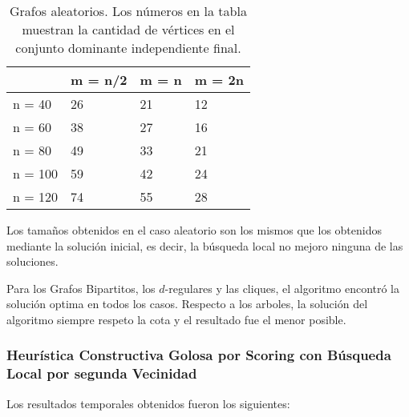 \begin{table}[H]
\centering
\label{my-label}
\begin{tabular}{|l|lll|}
\hline
        & \multicolumn{1}{l|}{m = n/2} & \multicolumn{1}{l|}{m = n} & m = 2n \\ \hline
n = 40  & 26                           & 21                         & 12     \\ \cline{1-1}
n = 60  & 38                           & 27                         & 16     \\ \cline{1-1}
n = 80  & 49                           & 33                         & 21     \\ \cline{1-1}
n = 100 & 59                           & 42                         & 24     \\ \cline{1-1}
n = 120 & 74                           & 55                         & 28     \\ \hline
\end{tabular}
\caption{Grafos aleatorios. Los números en la tabla muestran la cantidad de vértices en el conjunto dominante independiente final.}
\end{table}

Los tamaños obtenidos en el caso aleatorio son los mismos que los obtenidos mediante la solución inicial, es decir, la búsqueda local no mejoro ninguna de las soluciones.

Para los Grafos Bipartitos, los $d$-regulares y las cliques, el algoritmo encontró la solución optima en todos los casos. Respecto a los arboles, la solución del algoritmo siempre respeto la cota y el resultado fue el menor posible.

\subsubsection{Heurística Constructiva Golosa por Scoring con Búsqueda Local por segunda Vecinidad}

Los resultados temporales obtenidos fueron los siguientes:

